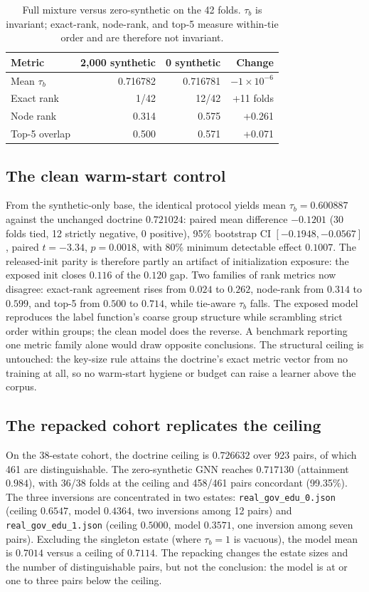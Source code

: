 \documentclass[conference,10pt]{IEEEtran}
\newcommand{\tb}{\tau_b}
\begin{document}
\begin{table}[t]
\centering
\caption{Full mixture versus zero-synthetic on the 42 folds. $\tb$ is invariant; exact-rank,
node-rank, and top-5 measure within-tie order and are therefore not invariant.}
\label{tab:zerosyn}
\footnotesize
\begin{tabular}{@{}lrrr@{}}
\toprule
Metric & 2{,}000 synthetic & 0 synthetic & Change \\
\midrule
Mean $\tb$ & 0.716782 & 0.716781 & $-1\times10^{-6}$ \\
Exact rank & 1/42 & 12/42 & +11 folds \\
Node rank & 0.314 & 0.575 & +0.261 \\
Top-5 overlap & 0.500 & 0.571 & +0.071 \\
\bottomrule
\end{tabular}
\end{table}

\subsection{The clean warm-start control}
From the synthetic-only base, the identical protocol yields mean $\tb=0.600887$ against the
unchanged doctrine $0.721024$: paired mean difference $-0.1201$ (30 folds tied, 12 strictly
negative, 0 positive), 95\% bootstrap CI $[-0.1948,-0.0567]$, paired $t=-3.34$, $p=0.0018$,
with 80\% minimum detectable effect $0.1007$. The released-init parity is therefore partly an
artifact of initialization exposure: the exposed init closes $0.116$ of the $0.120$ gap. Two
families of rank metrics now disagree: exact-rank agreement rises from $0.024$ to $0.262$,
node-rank from $0.314$ to $0.599$, and top-5 from $0.500$ to $0.714$, while tie-aware $\tb$
falls. The exposed model reproduces the label function's coarse group structure while
scrambling strict order within groups; the clean model does the reverse. A benchmark reporting
one metric family alone would draw opposite conclusions. The structural ceiling is untouched:
the key-size rule attains the doctrine's exact metric vector from no training at all, so no
warm-start hygiene or budget can raise a learner above the corpus.

\subsection{The repacked cohort replicates the ceiling}
On the 38-estate cohort, the doctrine ceiling is $0.726632$ over 923 pairs, of which 461 are
distinguishable. The zero-synthetic GNN reaches $0.717130$ (attainment $0.984$), with 36/38
folds at the ceiling and 458/461 pairs concordant (99.35\%). The three inversions are
concentrated in two estates: \texttt{real\_gov\_edu\_0.json} (ceiling $0.6547$, model $0.4364$,
two inversions among 12 pairs) and \texttt{real\_gov\_edu\_1.json} (ceiling $0.5000$, model
$0.3571$, one inversion among seven pairs). Excluding the singleton estate (where $\tb=1$ is
vacuous), the model mean is $0.7014$ versus a ceiling of $0.7114$. The repacking changes the
estate sizes and the number of distinguishable pairs, but not the conclusion: the model is at or
one to three pairs below the ceiling.
\end{document}
